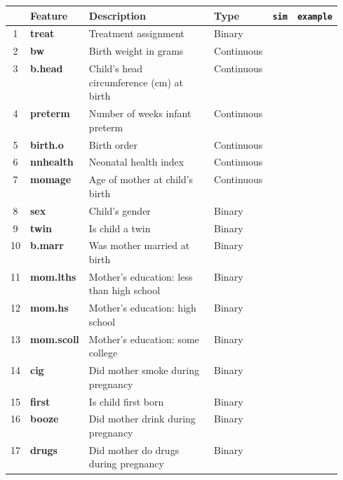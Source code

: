 \documentclass[10pt,letterpaper]{article}
\begin{document}
\begin{center}
	\begin{longtable}{||c | p{0.15\linewidth} p{0.4\linewidth} l c c||}
		\hline
		 & Feature & Description & Type & \texttt{sim} & \texttt{example}\\ [0.5ex] 
		\hline\hline
		1 & \textbf{treat} & Treatment assignment & Binary & \checkmark
		 & \checkmark \\
		\hline 
		2 & \textbf{bw} & Birth weight in grams & Continuous & \checkmark & \checkmark \\
		\hline
		3 & \textbf{b.head} & Child's head circumference (cm) at birth & Continuous & \checkmark & \\
		\hline
		4 & \textbf{preterm} & Number of weeks infant preterm  & Continuous & \checkmark & \checkmark\\
		\hline
		5 & \textbf{birth.o} & Birth order  & Continuous & \checkmark & \checkmark\\
		\hline
		6 & \textbf{nnhealth} & Neonatal health index  & Continuous & \checkmark & \checkmark \\
		\hline
		7 & \textbf{momage} & Age of mother at child's birth & Continuous & \checkmark & \checkmark \\ 
		\hline
		8 & \textbf{sex} & Child's gender & Binary & \checkmark & \checkmark \\ 
		\hline
		9 & \textbf{twin} & Is child a twin & Binary & \checkmark &  \\ 
		\hline
		10 & \textbf{b.marr} & Was mother married at birth & Binary & \checkmark & \checkmark \\ 
		\hline
		11 & \textbf{mom.lths} & Mother's education: less than high school & Binary & \checkmark & \checkmark \\ 
		\hline
		12 & \textbf{mom.hs} & Mother's education: high school  & Binary & \checkmark & \checkmark\\ 
		\hline
		13 & \textbf{mom.scoll} & Mother's education: some college & Binary & \checkmark & \checkmark \\ 
		\hline
		14 & \textbf{cig} & Did mother smoke during pregnancy & Binary & \checkmark &  \\ 
		\hline
		15 & \textbf{first} & Is child first born & Binary & \checkmark &  \\ 
		\hline
		16 & \textbf{booze} & Did mother drink during pregnancy & Binary & \checkmark &  \\ 
		\hline
		17 & \textbf{drugs} & Did mother do drugs during pregnancy & Binary & \checkmark & \checkmark \\ 

\end{longtable}
\end{center}
\end{document}
